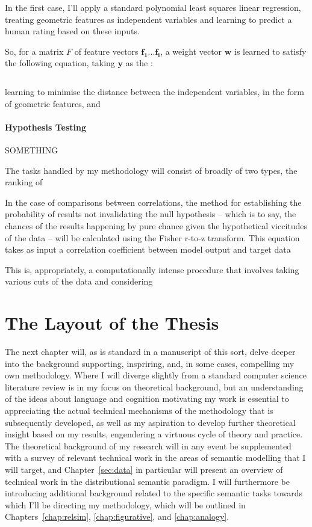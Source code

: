 In the first case, I'll apply a standard polynomial least squares linear regression, treating geometric features as independent variables and learning to predict a human rating based on these inputs.

So, for a matrix $F$ of feature vectors ${\mathbf{f_1}... \mathbf{f_i}}$, a weight vector $\mathbf{w}$ is learned to satisfy the following equation, taking $\mathbf{y}$ as the :

\begin{equation}

\end{equation}

learning to minimise the distance between the independent variables, in the form of geometric features, and 

\paragraph{Hypothesis Testing} SOMETHING

The tasks handled by my methodology will consist of broadly of two types, the ranking of 

In the case of comparisons between correlations, the method for establishing the probability of results not invalidating the null hypothesis -- which is to say, the chances of the results happening by pure chance given the hypothetical viccitudes of the data -- will be calculated using the Fisher r-to-z transform.  This equation takes as input a correlation coefficient between model output and target data


This is, appropriately, a computationally intense procedure that involves taking various cuts of the data and considering 

\section{The Layout of the Thesis}
The next chapter will, as is standard in a manuscript of this sort, delve deeper into the background supporting, inspriring, and, in some cases, compelling my own methodology.  Where I will diverge slightly from a standard computer science literature review is in my focus on theoretical background, but an understanding of the ideas about language and cognition motivating my work is essential to appreciating the actual technical mechanisms of the methodology that is subsequently developed, as well as my aspiration to develop further theoretical insight based on my results, engendering a virtuous cycle of theory and practice.  The theoretical background of my research will in any event be supplemented with a survey of relevant technical work in the areas of semantic modelling that I will target, and Chapter~\ref{sec:data} in particular will present an overview of technical work in the distributional semantic paradigm.  I will furthermore be introducing additional background related to the specific semantic tasks towards which I'll be directing my methodology, which will be outlined in Chapters~\ref{chap:relsim}, \ref{chap:figurative}, and \ref{chap:analogy}.

